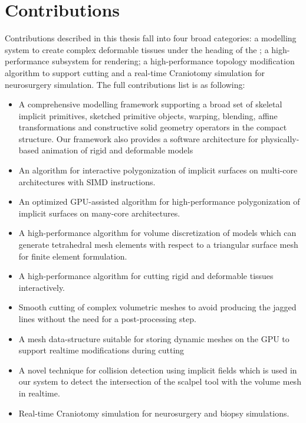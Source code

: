 \section{Contributions}
\label{sec:contributions}
Contributions described in this thesis fall into four broad categories: a modelling system to create 
complex deformable tissues under the heading of the \blob; a high-performance subsystem for 
rendering; a high-performance topology modification algorithm to support cutting and a  
real-time Craniotomy simulation for neurosurgery simulation. The full contributions list is as 
following:

\begin{itemize}
 \item A comprehensive modelling framework supporting a broad set of skeletal implicit primitives, 
 sketched primitive objects, warping, blending, affine transformations and constructive solid geometry 
 operators in the compact \blob structure. Our framework also provides a software architecture for 
 physically-based animation of rigid and deformable models 
 
 \item An algorithm for interactive polygonization of implicit surfaces on multi-core architectures with SIMD instructions.
 \item An optimized GPU-assisted algorithm for high-performance polygonization of implicit surfaces on many-core architectures.
 \item A high-performance algorithm for volume discretization of \blob models which can generate tetrahedral mesh elements with respect to a triangular 
 surface mesh for finite element formulation.
 \item A high-performance algorithm for cutting rigid and deformable tissues interactively.
 \item Smooth cutting of complex volumetric meshes to avoid producing the jagged lines without the 
 need for a post-processing step.

 \item A mesh data-structure suitable for storing dynamic meshes on the GPU to 
 support realtime modifications during cutting
 \item A novel technique for collision detection using implicit fields which is 
 used in our system to detect the intersection of the scalpel tool with the volume mesh in realtime. 
 
  \item Real-time Craniotomy simulation for neurosurgery and biopsy simulations.
\end{itemize}


